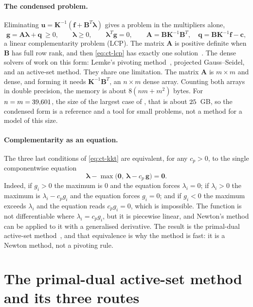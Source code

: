 \paragraph{The condensed problem.}
Eliminating $\bm u=\bm K^{-1}(\bm f+\bm B^T\bm\lambda)$ gives a problem in the multipliers alone,
\begin{equation}\label{eq:ct-lcp}
\bm g=\bm A\bm\lambda+\bm q\ \ge 0,\qquad \bm\lambda\ge0,\qquad \bm\lambda^T\bm g=0,\qquad \bm A=\bm B\bm K^{-1}\bm B^T,\quad \bm q=\bm B\bm K^{-1}\bm f-\bm c,
\end{equation}
a linear complementarity problem (LCP). The matrix $\bm A$ is positive definite when $\bm B$ has full row rank, and then \eqref{eq:ct-lcp} has exactly one solution~\cite{cottle1992lcp}. The dense solvers of \fea{} work on this form: Lemke's pivoting method~\cite{lemke1965bimatrix}, projected Gauss--Seidel, and an active-set method. They share one limitation. The matrix $\bm A$ is $m\times m$ and dense, and forming it needs $\bm K^{-1}\bm B^T$, an $n\times m$ dense array. Counting both arrays in double precision, the memory is about $8(nm+m^2)$ bytes. For $n=m=39{,}601$, the size of the largest case of , that is about $25$~GB, so the condensed form is a reference and a tool for small problems, not a method for a model of this size.

\paragraph{Complementarity as an equation.}
The three last conditions of \eqref{eq:ct-kkt} are equivalent, for any $c_p>0$, to the single componentwise equation
\begin{equation}\label{eq:ct-nonsmooth}
\bm\lambda-\max\bigl(\bm 0,\ \bm\lambda-c_p\,\bm g\bigr)=\bm 0 .
\end{equation}
Indeed, if $g_i>0$ the maximum is $0$ and the equation forces $\lambda_i=0$; if $\lambda_i>0$ the maximum is $\lambda_i-c_pg_i$ and the equation forces $g_i=0$; and if $g_i<0$ the maximum exceeds $\lambda_i$ and the equation reads $c_pg_i=0$, which is impossible. The function is not differentiable where $\lambda_i=c_pg_i$, but it is piecewise linear, and Newton's method can be applied to it with a generalised derivative. The result is the primal-dual active-set method~\cite{hintermuller2002pdas}, and that equivalence is why the method is fast: it is a Newton method, not a pivoting rule.

\section{The primal-dual active-set method and its three routes}\label{sec:ct-pdas}

